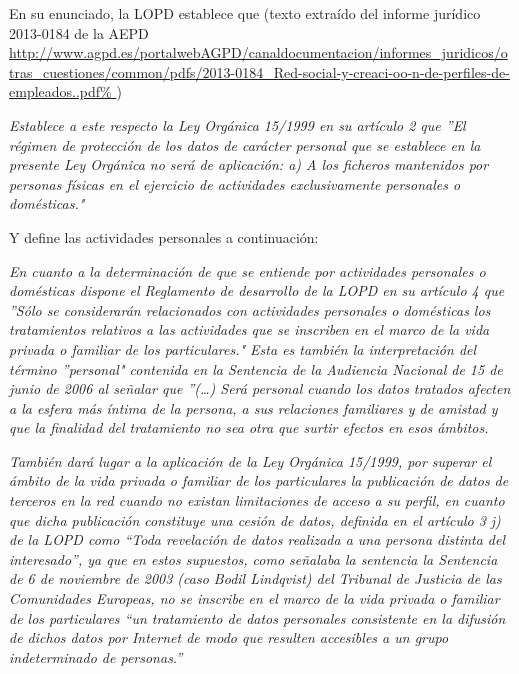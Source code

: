 En su enunciado, la LOPD establece que
(texto extraído del informe jurídico  2013-0184 de la AEPD
\url{http://www.agpd.es/portalwebAGPD/canaldocumentacion/informes_juridicos/otras_cuestiones/common/pdfs/2013-0184_Red-social-y-creaci-oo-n-de-perfiles-de-empleados..pdf%
})

\leftskip=1cm
\rightskip=1cm
{\em Establece a este
respecto la Ley Orgánica 15/1999 en su artículo 2 que ''El régimen de
protección de los datos de carácter personal que se establece en la
presente Ley Orgánica no será de aplicación: a) A los ficheros
mantenidos por personas físicas en el ejercicio de actividades
exclusivamente personales o domésticas."
}

\leftskip=0pt 
\rightskip=0pt

\noindent Y define las actividades personales a continuación:

\leftskip=1cm
\rightskip=1cm
{\em En cuanto a la determinación de que se entiende por actividades
personales o domésticas dispone el Reglamento de desarrollo de la LOPD en
su artículo 4 que ''Sólo se considerarán relacionados con actividades
personales o domésticas los tratamientos relativos a las actividades que se
inscriben en el marco de la vida privada o familiar de los particulares."
Esta es también la interpretación del término ''personal" contenida en la
Sentencia de la Audiencia Nacional de 15 de junio de 2006 al señalar que ''(…)
Será personal cuando los datos tratados afecten a la esfera más íntima de la
persona, a sus relaciones familiares y de amistad y que la finalidad del
tratamiento no sea otra que surtir efectos en esos ámbitos.}

\leftskip=1cm
\rightskip=1cm
{\em También dará lugar a la aplicación de la Ley Orgánica 15/1999, por
superar el ámbito de la vida privada o familiar de los particulares la publicación
de datos de terceros en la red cuando no existan limitaciones de acceso a su
perfil, en cuanto que dicha publicación constituye una cesión de datos, definida
en el artículo 3 j) de la LOPD como “Toda revelación de datos realizada a una
persona distinta del interesado”, ya que en estos supuestos, como señalaba la
sentencia la Sentencia de 6 de noviembre de 2003 (caso Bodil Lindqvist) del
Tribunal de Justicia de las Comunidades Europeas, no se inscribe en el marco
de la vida privada o familiar de los particulares “un tratamiento de datos
personales consistente en la difusión de dichos datos por Internet de modo que
resulten accesibles a un grupo indeterminado de personas.”}

